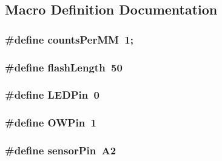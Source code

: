 \subsection{Macro Definition Documentation}
\hypertarget{OWHumidity2_8ino_a8f0a461ec2c621e04db91f4970f2f1d5}{
\subsubsection[{counts\-Per\-M\-M}]{\setlength{\rightskip}{0pt plus 5cm}\#define counts\-Per\-M\-M~1;}}\label{OWHumidity2_8ino_a8f0a461ec2c621e04db91f4970f2f1d5}
\hypertarget{OWHumidity2_8ino_a65b6f41e12d2d8bdbd3416c8db11770e}{
\subsubsection[{flash\-Length}]{\setlength{\rightskip}{0pt plus 5cm}\#define flash\-Length~50}}\label{OWHumidity2_8ino_a65b6f41e12d2d8bdbd3416c8db11770e}
\hypertarget{OWHumidity2_8ino_abd966e26c1237652c6c1dc46a8f14203}{
\subsubsection[{L\-E\-D\-Pin}]{\setlength{\rightskip}{0pt plus 5cm}\#define L\-E\-D\-Pin~0}}\label{OWHumidity2_8ino_abd966e26c1237652c6c1dc46a8f14203}
\hypertarget{OWHumidity2_8ino_a7f5aa1ac0711ae18877a165a9bf24625}{
\subsubsection[{O\-W\-Pin}]{\setlength{\rightskip}{0pt plus 5cm}\#define O\-W\-Pin~1}}\label{OWHumidity2_8ino_a7f5aa1ac0711ae18877a165a9bf24625}
\hypertarget{OWHumidity2_8ino_a6c53d6a30fb5dab269c504c7edc3465e}{
\subsubsection[{sensor\-Pin}]{\setlength{\rightskip}{0pt plus 5cm}\#define sensor\-Pin~A2}}\label{OWHumidity2_8ino_a6c53d6a30fb5dab269c504c7edc3465e}
